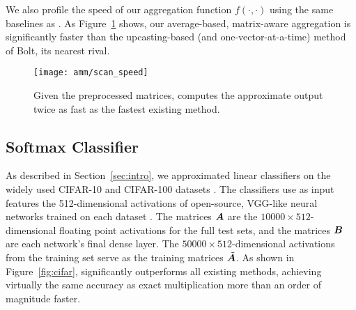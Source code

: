 \vspace{-1mm}
We also profile the speed of our aggregation function $f(\cdot, \cdot)$ using the same baselines as \citet{bolt}. As Figure~\ref{fig:scanSpeed} shows,
our average-based, matrix-aware aggregation is significantly faster than the upcasting-based (and one-vector-at-a-time) method of Bolt, its nearest rival.
\vspace{2mm}
\begin{figure}[h!]
\begin{center}
\texttt{[image: amm/scan\_speed]}
\caption{Given the preprocessed matrices, \oursp computes the approximate output twice as fast as the fastest existing method.}
\label{fig:scanSpeed}
\end{center}
\end{figure}

\vspace{-2mm}
\subsection{Softmax Classifier}
\vspace{-.5mm}

As described in Section~\ref{sec:intro}, we approximated linear classifiers on the widely used CIFAR-10 and CIFAR-100 datasets \cite{cifarDsets}. The classifiers use as input features the 512-dimensional activations of open-source, VGG-like neural networks trained on each dataset \cite{cifarVgg}. The matrices $\bm{A}$ are the $10000 \times 512$-dimensional floating point activations for the full test sets, and the matrices $\bm{B}$ are each network's final dense layer. The $50000 \times 512$-dimensional activations from the training set serve as the training matrices $\tilde{\bm{A}}$.
As shown in Figure~\ref{fig:cifar}, \oursp significantly outperforms all existing methods, achieving virtually the same accuracy as exact multiplication more than an order of magnitude faster.

